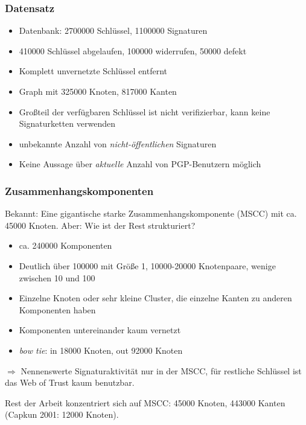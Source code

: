 \documentclass[10pt]{beamer}
\begin{document}
\begin{frame}
  \frametitle{Datensatz}
  \begin{itemize}
  \item Datenbank: 2700000 Schl\"ussel, 1100000 Signaturen
  \item 410000 Schl\"ussel abgelaufen, 100000 widerrufen, 50000 defekt
  \item Komplett unvernetzte Schl\"ussel entfernt
  \item Graph mit 325000 Knoten, 817000 Kanten
  \item Gro{\ss}teil der verf\"ugbaren Schl\"ussel ist nicht
    verifizierbar, kann keine Signaturketten verwenden
  \item unbekannte Anzahl von \emph{nicht-\"offentlichen} Signaturen
  \item Keine Aussage \"uber \emph{aktuelle} Anzahl von PGP-Benutzern
    m\"oglich
  \end{itemize}
\end{frame}

\begin{frame}
  \frametitle{Zusammenhangskomponenten}
  Bekannt: Eine gigantische starke Zusammenhangskomponente (MSCC) mit
  ca. 45000 Knoten. Aber: Wie ist der Rest strukturiert?

  \begin{itemize}
  \item ca. 240000 Komponenten
  \item Deutlich \"uber 100000 mit Gr\"o{\ss}e 1, 10000-20000
    Knotenpaare, wenige zwischen 10 und 100
  \item Einzelne Knoten oder sehr kleine Cluster, die einzelne Kanten
    zu anderen Komponenten haben
  \item Komponenten untereinander kaum vernetzt
  \item \emph{bow tie}: in 18000 Knoten, out 92000 Knoten
  \end{itemize}

  $\Rightarrow$ Nennenswerte Signaturaktivit\"at nur in der MSCC,
  f\"ur restliche Schl\"ussel ist das Web of Trust kaum benutzbar.
\vspace{0.5cm}

  Rest der Arbeit konzentriert sich auf MSCC: 45000 Knoten, 443000
  Kanten (Capkun 2001: 12000 Knoten).
  
\end{frame}
\end{document}
